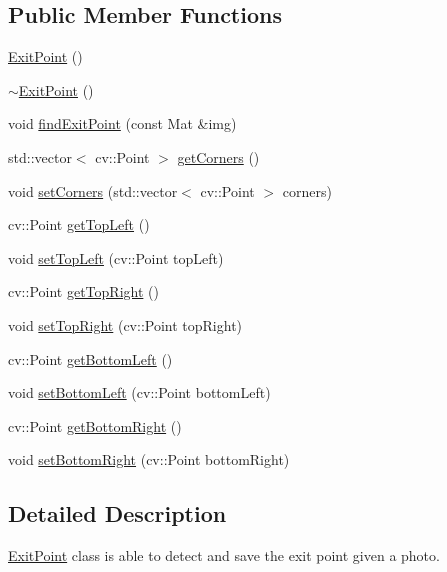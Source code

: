 \subsection*{Public Member Functions}
\begin{DoxyCompactItemize}
\item 
\mbox{\hyperlink{class_exit_point_ae472f935e952356c9bfe64298474d523}{Exit\+Point}} ()
\item 
\mbox{\hyperlink{class_exit_point_aa764fee5b37cb7dbda6f2fde39ffbc05}{$\sim$\+Exit\+Point}} ()
\item 
void \mbox{\hyperlink{class_exit_point_a2762c0c61bbe71a1a292b86e9517e860}{find\+Exit\+Point}} (const Mat \&img)
\item 
std\+::vector$<$ cv\+::\+Point $>$ \mbox{\hyperlink{class_exit_point_ac26a595a35b370cf7375874395715af0}{get\+Corners}} ()
\item 
void \mbox{\hyperlink{class_exit_point_aff4341c31734d77224b1251988949430}{set\+Corners}} (std\+::vector$<$ cv\+::\+Point $>$ corners)
\item 
cv\+::\+Point \mbox{\hyperlink{class_exit_point_ad373de21603871832e10568631ef3cda}{get\+Top\+Left}} ()
\item 
void \mbox{\hyperlink{class_exit_point_a31c88803968c8b215062b97b699721e2}{set\+Top\+Left}} (cv\+::\+Point top\+Left)
\item 
cv\+::\+Point \mbox{\hyperlink{class_exit_point_a448716aa575ba751f72ab0f437b6a138}{get\+Top\+Right}} ()
\item 
void \mbox{\hyperlink{class_exit_point_ae27c395eb18321cb120b99ffbed6028a}{set\+Top\+Right}} (cv\+::\+Point top\+Right)
\item 
cv\+::\+Point \mbox{\hyperlink{class_exit_point_a51ac01267f39908e468ec859ba8d3096}{get\+Bottom\+Left}} ()
\item 
void \mbox{\hyperlink{class_exit_point_a22bf3a433b3567d36463699e16aaa86b}{set\+Bottom\+Left}} (cv\+::\+Point bottom\+Left)
\item 
cv\+::\+Point \mbox{\hyperlink{class_exit_point_a7a0e9d613aa361083bd4bf91f2080398}{get\+Bottom\+Right}} ()
\item 
void \mbox{\hyperlink{class_exit_point_afe10f2b0cf00b654dc1c95183462ed1a}{set\+Bottom\+Right}} (cv\+::\+Point bottom\+Right)
\end{DoxyCompactItemize}


\subsection{Detailed Description}
\mbox{\hyperlink{class_exit_point}{Exit\+Point}} class is able to detect and save the exit point given a photo. 

